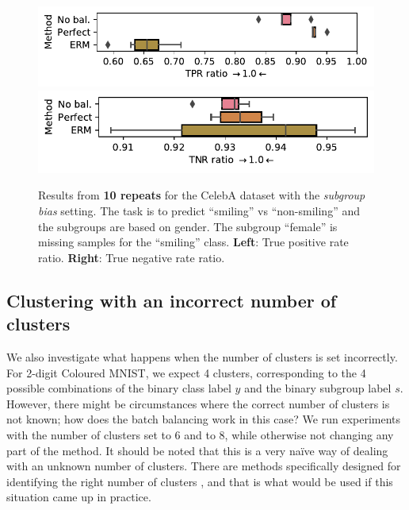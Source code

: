 \begin{figure}[htp]
  \centering
  \includegraphics[width=\columnwidth]{figures/celeba_gender_smiling_tprr.pdf}
  \includegraphics[width=\columnwidth]{figures/celeba_gender_smiling_tnrr.pdf}
  \caption{
    Results from \textbf{10 repeats} for the CelebA dataset with the \emph{subgroup bias} setting.
    The task is to predict ``smiling'' vs ``non-smiling'' and the subgroups are based on gender.
    The subgroup ``female'' is missing samples for the ``smiling'' class.
    \textbf{Left}: True positive rate ratio.
    \textbf{Right}: True negative rate ratio.
  }%
  \label{fig:celeba-gender-smiling-add}
\end{figure}

\subsection{Clustering with an incorrect number of clusters}\label{sec:overclustering}
We also investigate what happens when the number of clusters is set incorrectly.
For 2-digit Coloured MNIST, we expect 4 clusters, corresponding to the 4 possible combinations of the binary class label $y$ and the binary subgroup label $s$.
However, there might be circumstances where the correct number of clusters is not known; how does the batch balancing work in this case?
We run experiments with the number of clusters set to 6 and to 8, while otherwise not changing any part of the method.
It should be noted that this is a very na\"ive way of dealing with an unknown number of clusters.
There are methods specifically designed for identifying the right number of clusters \citep{hamerly2004learning,chazal2013persistence},
and that is what would be used if this situation came up in practice.

